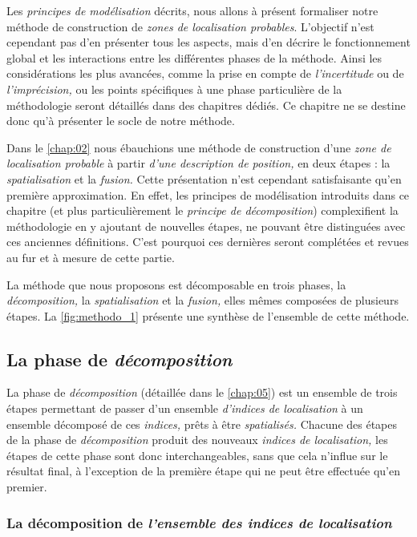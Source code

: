 Les \emph{principes de modélisation} décrits, nous allons à présent
formaliser notre méthode de construction de \emph{zones de
  localisation probables}. L'objectif n'est cependant pas d'en
présenter tous les aspects, mais d'en décrire le fonctionnement global
et les interactions entre les différentes phases de la méthode. Ainsi
les considérations les plus avancées, comme la prise en compte de
\emph{l'incertitude} ou de \emph{l'imprécision,} ou les points
spécifiques à une phase particulière de la méthodologie seront
détaillés dans des chapitres dédiés. Ce chapitre ne se destine donc
qu'à présenter le socle de notre méthode.

Dans le \autoref{chap:02} nous ébauchions une méthode de construction
d'une \emph{zone de localisation probable} à partir \emph{d'une
  description de position,} en deux étapes : la \emph{spatialisation}
et la \emph{fusion.} Cette présentation n'est cependant satisfaisante
qu'en première approximation. En effet, les principes de modélisation
introduits dans ce chapitre (et plus particulièrement le
\emph{principe de décomposition}) complexifient la méthodologie en y
ajoutant de nouvelles étapes, ne pouvant être distinguées avec ces
anciennes définitions. C'est pourquoi ces dernières seront complétées
et revues au fur et à mesure de cette partie.

La méthode que nous proposons est décomposable en trois phases, la
\emph{décomposition,} la \emph{spatialisation} et la \emph{fusion,}
elles mêmes composées de plusieurs étapes. La \autoref{fig:methodo_1}
présente une synthèse de l'ensemble de cette méthode.

\subsection{La phase de \emph{décomposition}}

La phase de \emph{décomposition} (détaillée dans le \autoref{chap:05})
est un ensemble de trois étapes permettant de passer d'un ensemble
\emph{d'indices de localisation} à un ensemble décomposé de ces
\emph{indices,} prêts à être \emph{spatialisés.} Chacune des étapes de
la phase de \emph{décomposition} produit des nouveaux \emph{indices de
  localisation,} les étapes de cette phase sont donc interchangeables,
sans que cela n'influe sur le résultat final, à l'exception de la
première étape qui ne peut être effectuée qu'en premier.

\subsubsection{La décomposition de \emph{l'ensemble des indices de
    localisation}}


